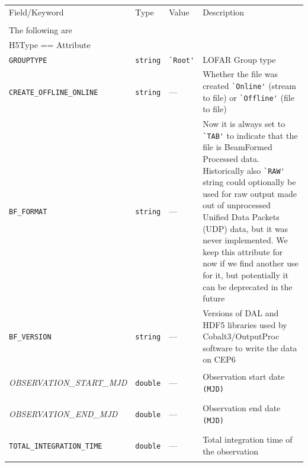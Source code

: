 \documentclass[a4paper,10pt,bibtotoc]{scrartcl}
\begin{document}
\vspace{5mm}
\tablefirsthead{%
}
\tablelasttail{\hline}
  \begin{supertabular}{|lllp{5.5cm}|}
    \hline
    \sc Field/Keyword  & \sc Type & \sc Value & Description \\
    \sc   & \sc & \sc & \\
    \hline \hline
    \sc The following are & \sc & \sc &\\
    \sc H5Type == Attribute & \sc & \sc &\\
    \hline 
  \verb|GROUPTYPE|   & \verb|string| & \verb|`Root'| & LOFAR Group type  \\
  \begin{small}\texttt{CREATE\_OFFLINE\_ONLINE}\end{small}  & \verb|string| & --- & Whether the file was created \verb|`Online'| (stream to file) or \verb|`Offline'| (file to file) \\
 \verb|BF_FORMAT|  & \verb|string| & --- & Now it is always set to \verb|`TAB'| to indicate that the file is BeamFormed Processed data. Historically also \verb|`RAW'| string could optionally be used for raw output made out of unprocessed Unified Data Packets (UDP) data, but it was never implemented. We keep this attribute for now if we find another use for it, but potentially it can be deprecated in the future \\
 \verb|BF_VERSION|  & \verb|string| & --- & Versions of DAL and HDF5 libraries used by Cobalt3/OutputProc software to write the data on CEP6 \\
  \begin{scriptsize}\textit{OBSERVATION\_START\_MJD}\end{scriptsize} & \small\verb|double| & ---  &  Observation start date \verb|(MJD)| \\
  \begin{scriptsize}\textit{OBSERVATION\_END\_MJD}\end{scriptsize} & \small\verb|double| & ---  &  Observation end date \verb|(MJD)| \\
  \begin{small}\verb|TOTAL_INTEGRATION_TIME|\end{small} & \verb|double| & --- & Total integration time of the observation \\

\end{supertabular}
\end{document}
